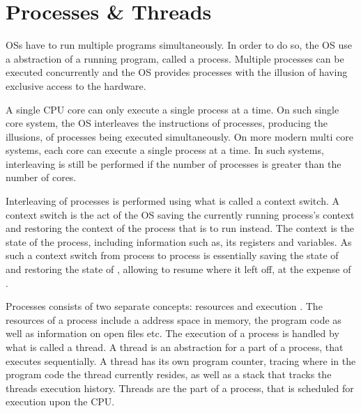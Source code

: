 \section{Processes \& Threads}\label{sec:processes_threads}
\acp{OS} have to run multiple programs simultaneously. In order to do so, the \ac{OS} use a abstraction of a running program, called a process\cite[p. 81]{tanenbaum2008modern}\cite[p. 16]{bryant2011computer}. Multiple processes can be executed concurrently and the \ac{OS} provides processes with the illusion of having exclusive access to the hardware\cite[p. 16]{bryant2011computer}. 

A single \ac{CPU} core can only execute a single process at a time. On such single core system, the \ac{OS} interleaves the instructions of processes, producing the illusions, of processes being executed simultaneously\cite[p. 16]{bryant2011computer}. On more modern multi core systems, each core can execute a single process at a time. In such systems, interleaving is still be performed if the number of processes is greater than the number of cores.

Interleaving of processes is performed using what is called a context switch\cite[p. 16]{bryant2011computer}. A context switch is the act of the \ac{OS} saving the currently running process's context and restoring the context of the process that is to run instead. The context is the state of the process, including information such as, its registers and variables\cite[p. 82]{tanenbaum2008modern}. As such a context switch from process  to process  is essentially saving the state of  and restoring the state of , allowing  to resume where it left off, at the expense of .

Processes consists of two separate concepts: resources and execution \cite[p. 98]{tanenbaum2008modern}. The resources of a process include a address space in memory, the program code as well as information on open files etc. The execution of a process is handled by what is called a thread\cite[p. 98]{tanenbaum2008modern}. A thread is an abstraction for a part of a process, that executes sequentially. A thread has its own program counter, tracing where in the program code the thread currently resides, as well as a stack that tracks the threads execution history\cite[p. 99]{tanenbaum2008modern}. Threads are the part of a process, that is scheduled for execution upon the \ac{CPU}.

